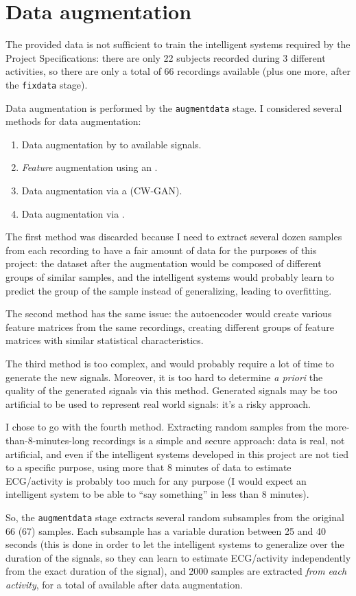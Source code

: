 \section{Data augmentation}\label{sec:augmentdata}

The provided data is not sufficient to train the intelligent systems required
by the Project Specifications: there are only 22 subjects recorded during 3
different activities, so there are only a total of 66 recordings available
(plus one more, after the \texttt{fixdata} stage).

Data augmentation is performed by the \texttt{augmentdata} stage. I considered
several methods for data augmentation:
\begin{enumerate}
\item Data augmentation by  to
	available signals.
\item \emph{Feature} augmentation using an .
\item Data augmentation via a  (CW-GAN).
\item Data augmentation via .
\end{enumerate}

The first method was discarded because I need to extract several dozen samples
from each recording to have a fair amount of data for the purposes of this
project: the dataset after the augmentation would be composed of different
groups of similar samples, and the intelligent systems would probably learn to
predict the group of the sample instead of generalizing, leading to
overfitting.

The second method has the same issue: the autoencoder would create various
feature matrices from the same recordings, creating different groups of feature
matrices with similar statistical characteristics.

The third method is too complex, and would probably require a lot of time to
generate the new signals. Moreover, it is too hard to determine \emph{a priori}
the quality of the generated signals via this method. Generated signals may be
too artificial to be used to represent real world signals: it's a risky
approach.

I chose to go with the fourth method. Extracting random samples from the
more-than-8-minutes-long recordings is a simple and secure approach: data is
real, not artificial, and even if the intelligent systems developed in this
project are not tied to a specific purpose, using more that 8 minutes of data
to estimate ECG/activity is probably too much for any purpose (I would expect
an intelligent system to be able to ``say something'' in less than 8 minutes).

So, the \texttt{augmentdata} stage extracts several random subsamples from the
original 66 (67) samples. Each subsample has a variable duration between
25 and 40 seconds (this is done in order to let the intelligent systems to
generalize over the duration of the signals, so they can learn to estimate
ECG/activity independently from the exact duration of the signal), and 2000
samples are extracted \emph{from each activity}, for a total of  available after data augmentation.
